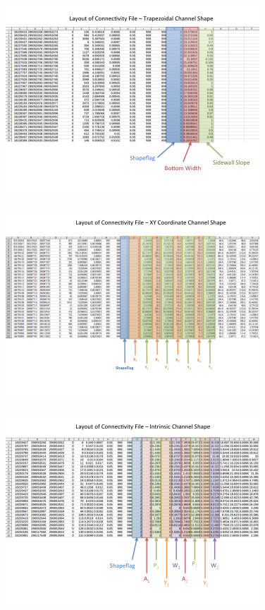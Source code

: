 \documentclass[12pt, letterpaper]{article}
\begin{document}
\begin{figure}[H]
	\centering
	\includegraphics[width = 0.85\textwidth]{figure/LayoutOfConnectovity/Connect_2.png} %
	\label{fig:process}%
\end{figure}
\begin{figure}[H]
	\centering
	\includegraphics[width = 0.85\textwidth]{figure/LayoutOfConnectovity/Connect_3.png} %
	\label{fig:process}%
\end{figure}
\begin{figure}[H]
	\centering
	\includegraphics[width = 0.85\textwidth]{figure/LayoutOfConnectovity/Connect_4.png} %
	\label{fig:process}%
\end{figure}
\end{document}
